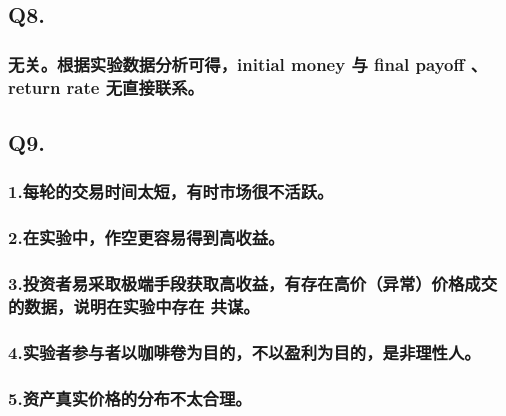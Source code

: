 \documentclass[]{article}
\begin{document}
\subsection{Q8.}\label{q8.}

\subsubsection{无关。根据实验数据分析可得，initial money 与 final payoff
、return rate
无直接联系。}\label{initial-money--final-payoff-return-rate-}

\subsection{Q9.}\label{q9.}

\subsubsection{1.每轮的交易时间太短，有时市场很不活跃。}

\subsubsection{2.在实验中，作空更容易得到高收益。}

\subsubsection{3.投资者易采取极端手段获取高收益，有存在高价（异常）价格成交的数据，说明在实验中存在
共谋。}\label{-}

\subsubsection{4.实验者参与者以咖啡卷为目的，不以盈利为目的，是非理性人。}

\subsubsection{5.资产真实价格的分布不太合理。}
\end{document}
